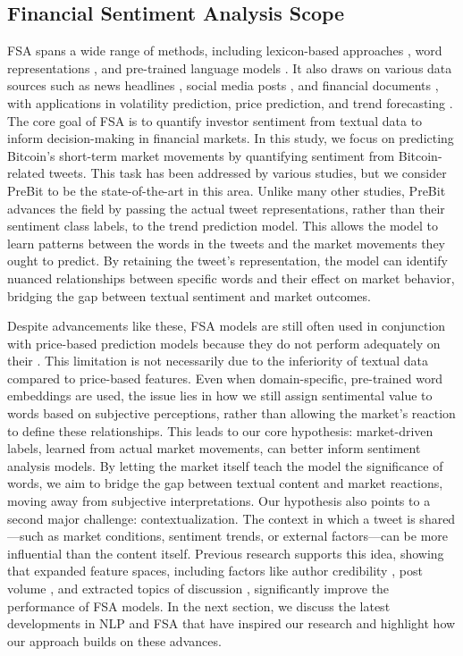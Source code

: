 \subsection{Financial Sentiment Analysis Scope}
FSA spans a wide range of methods, including lexicon-based approaches \cite{du2023finsenticnet}, word representations \cite{cryptocurrency_lamon_2017}, and pre-trained language models \cite{teng2025bert, huang2023finbert, sentiment_kulakowski_2023, fingpt_yang_2023, fineas_gutirrezfandio_2021}. It also draws on various data sources such as news headlines \cite{cryptocurrency_lamon_2017}, social media posts \cite{singh2020sentiment}, and financial documents \cite{man2019financial}, with applications in volatility prediction, price prediction, and trend forecasting \cite{du2024financial}. The core goal of FSA is to quantify investor sentiment from textual data to inform decision-making in financial markets. In this study, we focus on predicting Bitcoin’s short-term market movements by quantifying sentiment from Bitcoin-related tweets. This task has been addressed by various studies, but we consider PreBit \cite{prebit_zou_2023} to be the state-of-the-art in this area. Unlike many other studies, PreBit advances the field by passing the actual tweet representations, rather than their sentiment class labels, to the trend prediction model. This allows the model to learn patterns between the words in the tweets and the market movements they ought to predict. By retaining the tweet’s representation, the model can identify nuanced relationships between specific words and their effect on market behavior, bridging the gap between textual sentiment and market outcomes.

Despite advancements like these, FSA models are still often used in conjunction with price-based prediction models because they do not perform adequately on their \cite{man2019financial}. This limitation is not necessarily due to the inferiority of textual data compared to price-based features. Even when domain-specific, pre-trained word embeddings are used, the issue lies in how we still assign sentimental value to words based on subjective perceptions, rather than allowing the market’s reaction to define these relationships. This leads to our core hypothesis: market-driven labels, learned from actual market movements, can better inform sentiment analysis models. By letting the market itself teach the model the significance of words, we aim to bridge the gap between textual content and market reactions, moving away from subjective interpretations. Our hypothesis also points to a second major challenge: contextualization. The context in which a tweet is shared—such as market conditions, sentiment trends, or external factors—can be more influential than the content itself. Previous research supports this idea, showing that expanded feature spaces, including factors like author credibility \cite{elon_ante_2023, GARCIAMENDEZ2024124515, ask_akbiyik_2021}, post volume \cite{bitcoin_critien_2022}, and extracted topics of discussion \cite{hu2021stock}, significantly improve the performance of FSA models. In the next section, we discuss the latest developments in NLP and FSA that have inspired our research and highlight how our approach builds on these advances.

